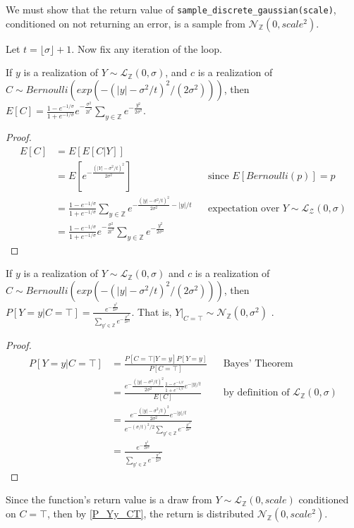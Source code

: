 \documentclass{article}
\begin{document}
We must show that the return value of \texttt{sample\_discrete\_gaussian(scale)}, conditioned on not returning an error, is a sample from $\mathcal{N}_\mathbb{Z}(0, scale^2)$.

Let $t = \lfloor \sigma \rfloor + 1$. 
Now fix any iteration of the loop. 

\begin{lemma}
If $y$ is a realization of $Y \sim \mathcal{L}_\mathbb{Z}(0, \sigma)$, and $c$ is a realization of $C \sim Bernoulli(exp(-(|y| - \sigma^2 / t)^2 / (2 \sigma^2)))$, then
$E[C] = \frac{1 - e^{-1/\sigma}}{1 + e^{-1/\sigma}}e^{-\frac{\sigma^2}{2t^2}} \sum_{y\in \mathbb{Z}} e^{-\frac{y^2}{2\sigma^2}}$\cite{CKS20}.
\end{lemma}

\begin{proof}
\begin{align*}
    E[C] &= E[E[C|Y]] \\
    &= E[e^{-\frac{(|Y| - \sigma^2/t)^2}{2\sigma^2}}] && \text{since } E[Bernoulli(p)] = p \\
    &= \frac{1 - e^{-1/\sigma}}{1 + e^{-1/\sigma}} \sum_{y\in \mathbb{Z}} e^{-\frac{(|y| - \sigma^2/t)^2}{2\sigma^2} - |y|/t} && \text{expectation over } Y \sim \mathcal{L}_\mathcal{Z}(0, \sigma) \\
    &= \frac{1 - e^{-1/\sigma}}{1 + e^{-1/\sigma}}e^{-\frac{\sigma^2}{2t^2}} \sum_{y\in \mathbb{Z}} e^{-\frac{y^2}{2\sigma^2}}
\end{align*}
\end{proof}

\begin{theorem}
\label{P_Yy_CT} If $y$ is a realization of $Y \sim \mathcal{L}_\mathbb{Z}(0, \sigma)$ and $c$ is a realization of $C \sim Bernoulli(exp(-(|y| - \sigma^2 / t)^2 / (2 \sigma^2)))$, then
$P[Y=y | C=\top] = \frac{e^{-\frac{y^2}{2\sigma^2}}}{\sum_{y' \in \mathbb{Z}} e^{-\frac{y'^2}{2\sigma^2}}}$. That is, $Y|_{C=\top} \sim \mathcal{N}_\mathbb{Z}(0, \sigma^2)$ \cite{CKS20}.
\end{theorem}

\begin{proof}

\begin{align*}
    P[Y=y | C=\top] &= \frac{P[C=\top|Y=y]P[Y=y]}{P[C=\top]} && \text{Bayes' Theorem} \\
    &= \frac{e^-\frac{(|y| - \sigma^2/t)^2}{2\sigma^2} \frac{1 - e^{-1/t}}{1 + e^{-1/t}} e^{-|y|/t}}{E[C]} && \text{by definition of } \mathcal{L}_\mathbb{Z}(0, \sigma) \\
    &= \frac{e^-\frac{(|y| - \sigma^2/t)^2}{2\sigma^2} e^{-|y|/t}}{e^{-(\sigma/t)^2/2} \sum_{y' \in \mathbb{Z}} e^{-\frac{y'^2}{2\sigma^2}}} \\
    &= \frac{e^{-\frac{y^2}{2\sigma^2}}}{\sum_{y' \in \mathbb{Z}} e^{-\frac{y'^2}{2\sigma^2}}}
\end{align*}
\end{proof}

Since the function's return value is a draw from $Y \sim \mathcal{L}_\mathbb{Z}(0, scale)$ conditioned on $C = \top$, then by \ref{P_Yy_CT}, the return is distributed $\mathcal{N}_\mathbb{Z}(0, scale^2)$.



\end{document}
